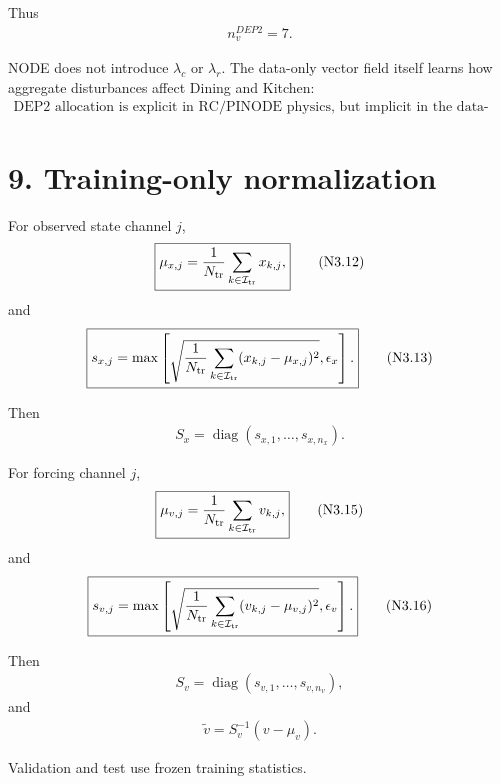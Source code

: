 \documentclass[11pt]{article}
\begin{document}
Thus
\begin{align}
\boxed{n_v^{DEP2}=7.}
\tag{N3.10}
\end{align}

NODE does not introduce \(\lambda_c\) or \(\lambda_r\). The data-only vector field itself learns how aggregate disturbances affect Dining and Kitchen:
\begin{align}
\boxed{
\text{DEP2 allocation is explicit in RC/PINODE physics,
but implicit in the data-only NODE.}
}
\tag{N3.11}
\end{align}

\section*{9. Training-only normalization}

For observed state channel \(j\),
\begin{align}
\boxed{
\mu_{x,j}
=
\frac{1}{N_{\rm tr}}
\sum_{k\in\mathcal I_{\rm tr}}x_{k,j},
}
\tag{N3.12}
\end{align}
and
\begin{align}
\boxed{
s_{x,j}
=
\max\left[
\sqrt{
\frac{1}{N_{\rm tr}}
\sum_{k\in\mathcal I_{\rm tr}}
(x_{k,j}-\mu_{x,j})^2
},
\epsilon_x
\right].
}
\tag{N3.13}
\end{align}

Then
\begin{align}
\boxed{
S_x=\operatorname{diag}(s_{x,1},\ldots,s_{x,n_x}).
}
\tag{N3.14}
\end{align}

For forcing channel \(j\),
\begin{align}
\boxed{
\mu_{v,j}
=
\frac{1}{N_{\rm tr}}
\sum_{k\in\mathcal I_{\rm tr}}v_{k,j},
}
\tag{N3.15}
\end{align}
and
\begin{align}
\boxed{
s_{v,j}
=
\max\left[
\sqrt{
\frac{1}{N_{\rm tr}}
\sum_{k\in\mathcal I_{\rm tr}}
(v_{k,j}-\mu_{v,j})^2
},
\epsilon_v
\right].
}
\tag{N3.16}
\end{align}

Then
\begin{align}
\boxed{
S_v=\operatorname{diag}(s_{v,1},\ldots,s_{v,n_v}),
}
\tag{N3.17}
\end{align}
and
\begin{align}
\boxed{
\widetilde v=S_v^{-1}(v-\mu_v).
}
\tag{N3.18}
\end{align}

Validation and test use frozen training statistics.
\end{document}
